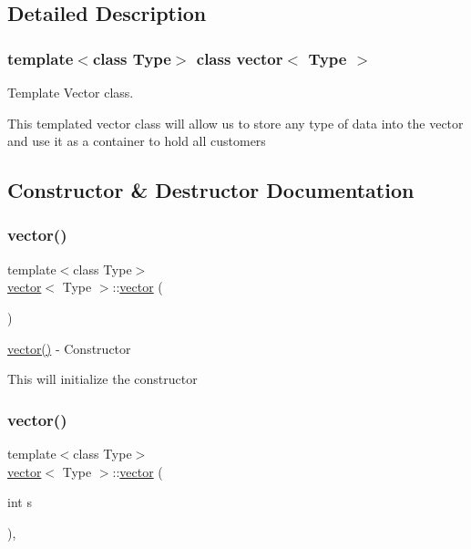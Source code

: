 \subsection{Detailed Description}
\subsubsection*{template$<$class Type$>$\newline
class vector$<$ Type $>$}

Template Vector class. 

This templated vector class will allow us to store any type of data into the vector and use it as a container to hold all customers 

\subsection{Constructor \& Destructor Documentation}
\hypertarget{classvector_ab8d8ebaa9b91a05bb7a94371cb84c042}{}\label{classvector_ab8d8ebaa9b91a05bb7a94371cb84c042} 
\subsubsection{\texorpdfstring{vector()}{vector()}\hspace{0.1cm}{\footnotesize\ttfamily [1/3]}}
{\footnotesize\ttfamily template$<$class Type$>$ \\
\hyperlink{classvector}{vector}$<$ Type $>$\+::\hyperlink{classvector}{vector} (\begin{DoxyParamCaption}{ }\end{DoxyParamCaption})\hspace{0.3cm}{\ttfamily [inline]}}



\hyperlink{classvector_ab8d8ebaa9b91a05bb7a94371cb84c042}{vector()} -\/ Constructor 

This will initialize the constructor \hypertarget{classvector_a98cdf37dc536057976131f5f9bb8e402}{}\label{classvector_a98cdf37dc536057976131f5f9bb8e402} 
\subsubsection{\texorpdfstring{vector()}{vector()}\hspace{0.1cm}{\footnotesize\ttfamily [2/3]}}
{\footnotesize\ttfamily template$<$class Type$>$ \\
\hyperlink{classvector}{vector}$<$ Type $>$\+::\hyperlink{classvector}{vector} (\begin{DoxyParamCaption}\item[{int}]{s }\end{DoxyParamCaption})\hspace{0.3cm}{\ttfamily [inline]}, {\ttfamily [explicit]}}



